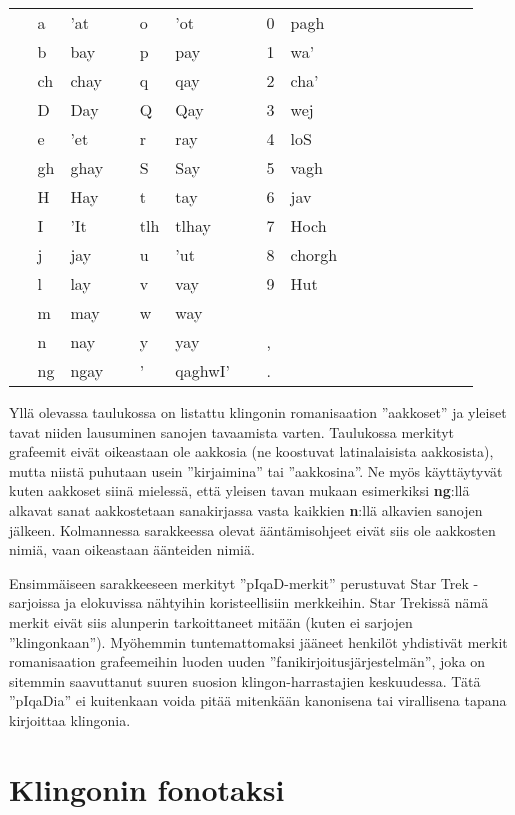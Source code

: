 \documentclass{book}
\begin{document}
\begin{tabular}{Tl Bl Il | Tl Bl Il | Tl l Il}
     & a & 'at &  & o & 'ot &  & 0 & pagh \\
     & b & bay &  & p & pay &  & 1 & wa' \\
     & ch & chay &  & q & qay &  & 2 & cha' \\
     & D & Day &  & Q & Qay &  & 3 & wej \\
     & e & 'et &  & r & ray &  & 4 & loS \\
     & gh & ghay &  & S & Say &  & 5 & vagh \\
     & H & Hay &  & t & tay &  & 6 & jav \\
     & I & 'It &  & tlh & tlhay &  & 7 & Hoch \\
     & j & jay &  & u & 'ut &  & 8 & chorgh\\
     & l & lay &  & v & vay &  & 9 & Hut\\
     & m & may &  & w & way & & & \\
     & n & nay &  & y & yay &  & , & \\
     & ng & ngay &  & ' & qaghwI' &  & . & \\
\end{tabular}

Yllä olevassa taulukossa on listattu klingonin romanisaation ''aakkoset'' ja yleiset tavat niiden lausuminen sanojen tavaamista varten.
Taulukossa merkityt grafeemit eivät oikeastaan ole aakkosia (ne koostuvat latinalaisista aakkosista), mutta niistä puhutaan usein ''kirjaimina'' tai ''aakkosina''.
Ne myös käyttäytyvät kuten aakkoset siinä mielessä,
että yleisen tavan mukaan esimerkiksi \textbf{ng}:llä alkavat sanat aakkostetaan sanakirjassa vasta kaikkien \textbf{n}:llä alkavien sanojen jälkeen.
Kolmannessa sarakkeessa olevat ääntämisohjeet eivät siis ole aakkosten nimiä, vaan oikeastaan äänteiden nimiä.

Ensimmäiseen sarakkeeseen merkityt ''pIqaD-merkit'' perustuvat Star Trek -sarjoissa ja elokuvissa nähtyihin koristeellisiin merkkeihin.
Star Trekissä nämä merkit eivät siis alunperin tarkoittaneet mitään (kuten ei sarjojen ''klin\-gon\-kaan'').
Myöhemmin tuntemattomaksi jääneet henkilöt yhdistivät merkit romanisaation grafeemeihin luoden uuden ''fanikirjoitusjärjestelmän'',
joka on sitemmin saavuttanut suuren suosion klingon-harrastajien keskuudessa.
Tätä ''pIqaDia'' ei kuitenkaan voida pitää mitenkään kanonisena tai virallisena tapana kirjoittaa klingonia.

\chapter{Klingonin fonotaksi}
\label{apx:fonotaksi}
\end{document}
